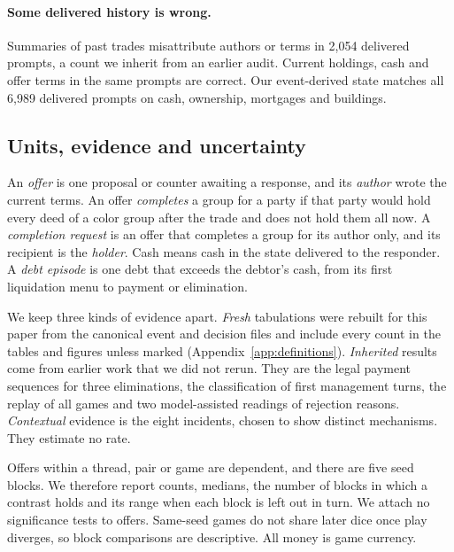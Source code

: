 \paragraph{Some delivered history is wrong.} Summaries of past trades misattribute authors or terms in 2,054 delivered prompts, a count we inherit from an earlier audit. Current holdings, cash and offer terms in the same prompts are correct. Our event-derived state matches all 6,989 delivered prompts on cash, ownership, mortgages and buildings.

\subsection{Units, evidence and uncertainty}

An \emph{offer} is one proposal or counter awaiting a response, and its \emph{author} wrote the current terms. An offer \emph{completes} a group for a party if that party would hold every deed of a color group after the trade and does not hold them all now. A \emph{completion request} is an offer that completes a group for its author only, and its recipient is the \emph{holder}. Cash means cash in the state delivered to the responder. A \emph{debt episode} is one debt that exceeds the debtor's cash, from its first liquidation menu to payment or elimination.

We keep three kinds of evidence apart. \emph{Fresh} tabulations were rebuilt for this paper from the canonical event and decision files and include every count in the tables and figures unless marked (Appendix~\ref{app:definitions}). \emph{Inherited} results come from earlier work that we did not rerun. They are the legal payment sequences for three eliminations, the classification of first management turns, the replay of all games and two model-assisted readings of rejection reasons. \emph{Contextual} evidence is the eight incidents, chosen to show distinct mechanisms. They estimate no rate.

Offers within a thread, pair or game are dependent, and there are five seed blocks. We therefore report counts, medians, the number of blocks in which a contrast holds and its range when each block is left out in turn. We attach no significance tests to offers. Same-seed games do not share later dice once play diverges, so block comparisons are descriptive. All money is game currency.
